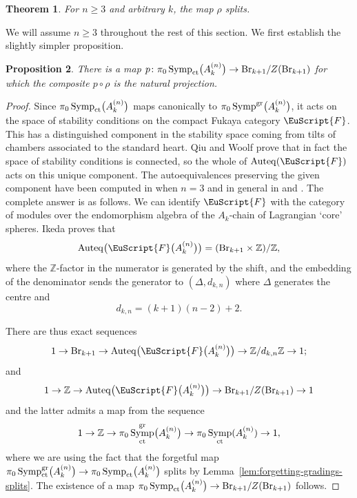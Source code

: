 \documentclass[10pt,a4paper]{amsart}
\DeclareMathOperator{\Auteq}{Auteq}
\newcommand{\scrF}{\EuScript{F}}
\DeclareMathOperator{\Symp}{Symp}
\def\bZ{\mathbb{Z}}
\newtheorem{thm}{Theorem}[section]
\newtheorem{prop}[thm]{Proposition}
\theoremstyle{definition}
\numberwithin{equation}{section}
\begin{document}
\begin{thm}\label{thm:milnor case}
For $n\geq 3$ and arbitrary $k$, the map $\rho$ splits.
\end{thm}


We will assume $n\geq 3$ throughout the rest of this section. We first establish the slightly simpler proposition.

\begin{prop}\label{prop:mod center}
There is a map $p\colon \pi_0\Symp_{\rm ct}\bigl(A_k^{(n)}\bigr) \to {\rm Br}_{k+1}/Z({\rm Br}_{k+1})$ for which the composite $p \circ \rho$ is the natural projection.
\end{prop}

\begin{proof}
Since $\pi_0\Symp_{\rm ct}\bigl(A_k^{(n)}\bigr)$ maps canonically to $\pi_0\Symp^{\rm gr}\bigr(A_k^{(n)}\bigr)$, it acts on the space of stability conditions on the compact Fukaya category $\scrF$. This has a distinguished component in the stability space coming from tilts of chambers associated to the standard heart. Qiu and Woolf \cite[Theorem~B]{Qiu-Woolf} prove that in fact the space of stability conditions is connected, so the whole of $\Auteq(\scrF)$ acts on this unique component. The autoequivalences preserving the given component have been computed in \cite[Theorem~9.9]{BS} when $n=3$ and in general in \cite[Theorem~7.16]{Ikeda} and \cite[Theorem~B]{Qiu-Woolf}. The complete answer is as follows. We can identify $\scrF$ with the category of modules over the endomorphism algebra of the $A_k$-chain of Lagrangian `core' spheres. Ikeda proves that
\begin{equation} \label{eqn:full aut group for A_k}
\Auteq\bigl(\scrF\bigl(A_k^{(n)}\bigr)\bigr) = ({\rm Br}_{k+1} \times \bZ) / \bZ,
\end{equation}
where the $\bZ$-factor in the numerator is generated by the shift, and the embedding of the denominator sends the generator to $(\Delta, d_{k,n})$ where $\Delta$ generates the centre and
\begin{equation} \label{eqn:dkn}
d_{k,n} = (k+1)(n-2) + 2.
\end{equation}

There are thus exact sequences
\begin{equation*}%
1 \to {\rm Br}_{k+1} \to \Auteq\bigl(\scrF\bigl(A_k^{(n)}\bigr)\bigr) \to \bZ/d_{k,n}\bZ \to 1;
\end{equation*}
and
\begin{equation*}%
1 \to \bZ \to \Auteq\bigl(\scrF\bigl(A_k^{(n)}\bigr)\bigr) \to {\rm Br}_{k+1}/Z({\rm Br}_{k+1}) \to 1
\end{equation*}
and the latter admits a map from the sequence
\[
1 \to \bZ \to \pi_0\Symp^{\rm gr}_{\rm ct}\bigl(A_k^{(n)}\bigr) \to \pi_0\Symp_{\rm ct}(A_k^{(n)}) \to 1,
\]
where we are using the fact that the forgetful map $ \pi_0\Symp^{\rm gr}_{\rm ct}\bigl(A_k^{(n)}\bigr) \to \pi_0\Symp_{\rm ct}\bigl(A_k^{(n)}\bigr)$ splits by Lemma~\ref{lem:forgetting-gradings-splits}.
The existence of a map $\pi_0\Symp_{\rm ct}\bigl(A_k^{(n)}\bigr) \to {\rm Br}_{k+1} / Z({\rm Br}_{k+1})$ follows.


\end{proof}
\end{document}
